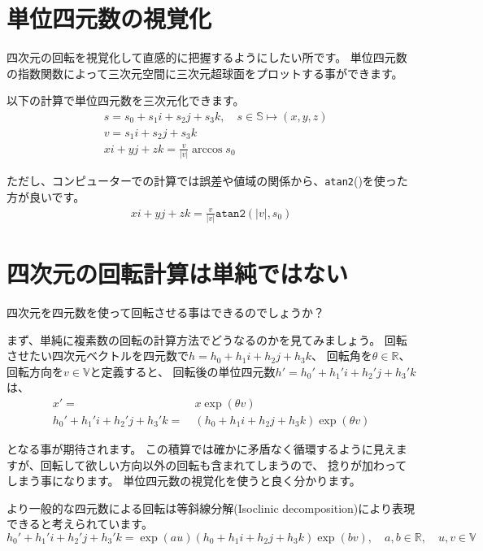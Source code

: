 \documentclass[a4paper,12pt]{jsreport}
\begin{document}
\section{単位四元数の視覚化}

四次元の回転を視覚化して直感的に把握するようにしたい所です。
単位四元数の指数関数によって三次元空間に三次元超球面をプロットする事ができます。

以下の計算で単位四元数を三次元化できます。
\begin{equation}
\begin{split}
&s=s_0+s_1i+s_2j+s_3k,\quad s\in\mathbb{S}\mapsto (x,y,z)\\
&v=s_1i+s_2j+s_3k\\
&xi+yj+zk=\frac{v}{|v|}\arccos s_0
\end{split}
\end{equation}

ただし、コンピューターでの計算では誤差や値域の関係から、\texttt{atan2}()を使った方が良いです。
\begin{gather}
xi+yj+zk=\frac{v}{|v|}\texttt{atan2}(|v|, s_0)
\end{gather}

\section{四次元の回転計算は単純ではない}

四次元を四元数を使って回転させる事はできるのでしょうか？

まず、単純に複素数の回転の計算方法でどうなるのかを見てみましょう。
回転させたい四次元ベクトルを四元数で$h=h_0+h_1i+h_2j+h_3k$、
回転角を$\theta\in\mathbb{R}$、回転方向を$v\in\mathbb{V}$と定義すると、
回転後の単位四元数$h'=h_0'+h_1'i+h_2'j+h_3'k$は、
\begin{equation}
\begin{split}
x'=~&x\exp(\theta v)\\
h_0'+h_1'i+h_2'j+h_3'k=~&(h_0+h_1i+h_2j+h_3k)\exp(\theta v)
\end{split}
\end{equation}

となる事が期待されます。
この積算では確かに矛盾なく循環するように見えますが、回転して欲しい方向以外の回転も含まれてしまうので、
捻りが加わってしまう事になります。
単位四元数の視覚化を使うと良く分かります。

より一般的な四元数による回転は等斜線分解(Isoclinic decomposition)により表現できると考えられています。
\begin{equation}
h_0'+h_1'i+h_2'j+h_3'k=\exp(au)(h_0+h_1i+h_2j+h_3k)\exp(bv),\quad a,b\in\mathbb{R},\quad u,v\in\mathbb{V}
\end{equation}
\end{document}
